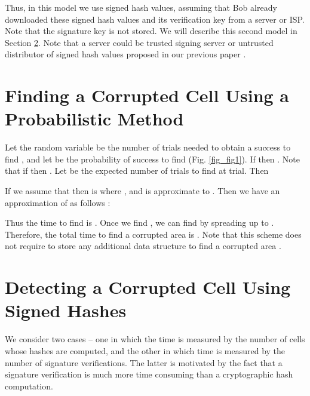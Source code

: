 \documentclass{llncs}
\begin{document}
Thus, in this model we use signed hash values, assuming that Bob already downloaded these signed hash values 
and its verification key from a server or ISP. Note that the signature key is not stored.
We will describe this second model in Section \ref{Model2}. 
Note that a server could be trusted signing server 
or untrusted distributor of signed hash values proposed in our previous paper \cite{AtChKu08}.

\section{Finding a Corrupted Cell Using a Probabilistic Method}
\label{Model1}

\begin{figure*}
\centerline{
\hfil
{}}
\caption{Probabilistic Method}
\label{fig_fig1}
\end{figure*}

Let the random variable  be the number of trials needed to obtain a success to find ,
and let  be the probability of success to find  (Fig. \ref{fig_fig1}).
If  then 
. 
Note that if  then .
Let  be the expected number of trials to find  at  trial. Then 

If we assume that  then  
is  where , and  is approximate to . 
Then we have an approximation of  as follows :

Thus the time to find  is . 
Once we find , we can find  by spreading up to .
Therefore, the total time to find a corrupted area  is .
Note that this scheme does not require to store any additional data structure to find a corrupted area .

\section{Detecting a Corrupted Cell Using Signed Hashes}
\label{Model2}

We consider two cases -- one in which the time is measured
by the number of cells whose hashes are computed, and the other in which
time is measured by the number of signature verifications.
The latter is motivated by the fact that a signature verification is 
much more time consuming than a cryptographic hash computation.
\end{document}
